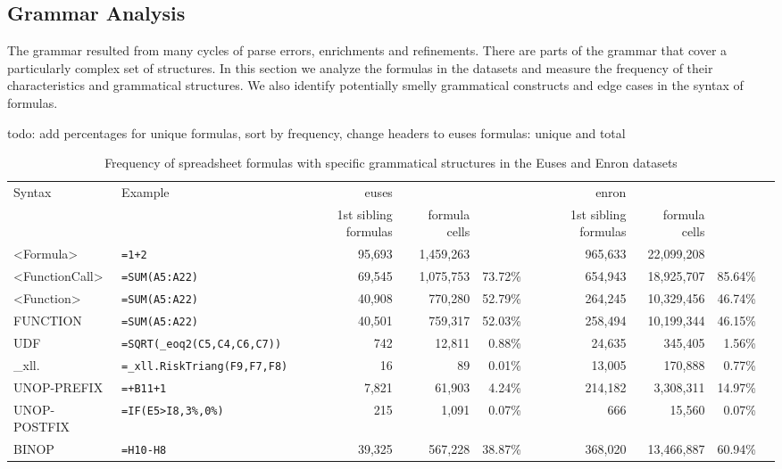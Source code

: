 \documentclass[conference]{IEEEtran}
\begin{document}
\subsection{Grammar Analysis}
The grammar resulted from many cycles of parse errors, enrichments and refinements. There are parts of the grammar that cover a particularly complex set of structures. In this section we analyze the formulas in the datasets and measure the frequency of their characteristics and grammatical structures. We also identify potentially smelly grammatical constructs and edge cases in the syntax of formulas.

todo: add percentages for unique formulas, sort by frequency, change headers to euses formulas: unique and total

\begin{table*}
	\label{table:occurences}
	\caption{Frequency of spreadsheet formulas with specific grammatical structures in the Euses and Enron datasets}
	\begin{tabular}{llrrrrrrr}
		\hline
		Syntax & Example & euses &  &  & enron &  & \\
		&  & 1st sibling formulas & formula cells &  & 1st sibling formulas & formula cells & \\
		\hline
		<Formula> & \texttt{=1+2} & 95,693 & 1,459,263 &  & 965,633 & 22,099,208 & \\
		<FunctionCall> & \texttt{=SUM(A5:A22)} & 69,545 & 1,075,753 & 73.72\% & 654,943 & 18,925,707 & 85.64\%\\
		<Function> & \texttt{=SUM(A5:A22)} & 40,908 & 770,280 & 52.79\% & 264,245 & 10,329,456 & 46.74\%\\
		FUNCTION & \texttt{=SUM(A5:A22)} & 40,501 & 759,317 & 52.03\% & 258,494 & 10,199,344 & 46.15\%\\
		UDF & \texttt{=SQRT(_eoq2(C5,C4,C6,C7))} & 742 & 12,811 & 0.88\% & 24,635 & 345,405 & 1.56\%\\
		_xll. & \texttt{=_xll.RiskTriang(F9,F7,F8)} & 16 & 89 & 0.01\% & 13,005 & 170,888 & 0.77\%\\
		UNOP-PREFIX & \texttt{=+B11+1} & 7,821 & 61,903 & 4.24\% & 214,182 & 3,308,311 & 14.97\%\\
		UNOP-POSTFIX & \texttt{=IF(E5>I8,3\%,0\%)} & 215 & 1,091 & 0.07\% & 666 & 15,560 & 0.07\%\\
			BINOP & \texttt{=H10-H8} & 39,325 & 567,228 & 38.87\% & 368,020 & 13,466,887 & 60.94\%\\
			

\end{tabular}
\end{table*}
\end{document}

